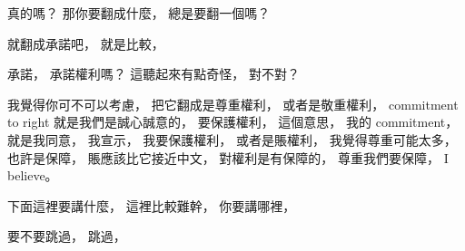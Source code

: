 \hypertarget{w06:cue:1745}{}真的嗎？
\hypertarget{w06:cue:1746}{}那你要翻成什麼，
\hypertarget{w06:cue:1747}{}總是要翻一個嗎？

\hypertarget{w06:cue:1748}{}就翻成承諾吧，
\hypertarget{w06:cue:1749}{}就是比較，

\hypertarget{w06:cue:1750}{}承諾，
\hypertarget{w06:cue:1751}{}承諾權利嗎？
\hypertarget{w06:cue:1752}{}這聽起來有點奇怪，
\hypertarget{w06:cue:1753}{}對不對？

\hypertarget{w06:cue:1754}{}我覺得你可不可以考慮，
\hypertarget{w06:cue:1755}{}把它翻成是尊重權利，
\hypertarget{w06:cue:1756}{}或者是敬重權利，
\hypertarget{w06:cue:1757}{}commitment to right
\hypertarget{w06:cue:1758}{}就是我們是誠心誠意的，
\hypertarget{w06:cue:1759}{}要保護權利，
\hypertarget{w06:cue:1760}{}這個意思，
\hypertarget{w06:cue:1761}{}我的 commitment，
\hypertarget{w06:cue:1762}{}就是我同意，
\hypertarget{w06:cue:1763}{}我宣示，
\hypertarget{w06:cue:1764}{}我要保護權利，
\hypertarget{w06:cue:1765}{}或者是賬權利，
\hypertarget{w06:cue:1766}{}我覺得尊重可能太多，
\hypertarget{w06:cue:1767}{}也許是保障，
\hypertarget{w06:cue:1768}{}賬應該比它接近中文，
\hypertarget{w06:cue:1769}{}對權利是有保障的，
\hypertarget{w06:cue:1770}{}尊重我們要保障，
\hypertarget{w06:cue:1771}{}I believe。

\hypertarget{w06:cue:1772}{}下面這裡要講什麼，
\hypertarget{w06:cue:1773}{}這裡比較難幹，
\hypertarget{w06:cue:1774}{}你要講哪裡，

\hypertarget{w06:cue:1775}{}要不要跳過，
\hypertarget{w06:cue:1776}{}跳過，


